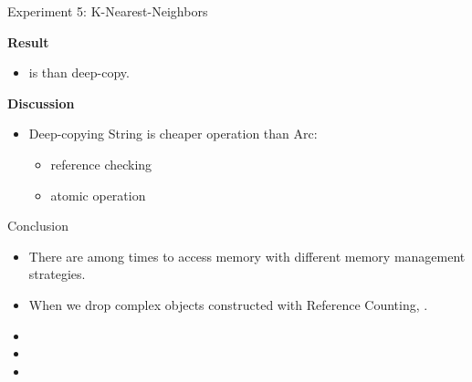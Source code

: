 \documentclass[9pt]{beamer}
\begin{document}
\begin{frame}[fragile]{Experiment 5: K-Nearest-Neighbors}
    
    \textbf{Result}
    \begin{itemize}
        \item {} is  than deep-copy.
    \end{itemize}

    \vspace{0.5cm}

    \textbf{Discussion}
    \begin{itemize}
        \item Deep-copying String is cheaper operation than Arc: 
        \begin{itemize}
            \item reference checking
            \item atomic operation
        \end{itemize}
    \end{itemize} 
\end{frame}


\begin{frame}[fragile]{Conclusion}
    \begin{itemize}
        \item There are  among times to access memory with different memory management strategies.
        \item When we drop complex objects constructed with Reference Counting, . 
        \item {}
        \item {}
        \item {}
    \end{itemize}
\end{frame}


\end{document}

